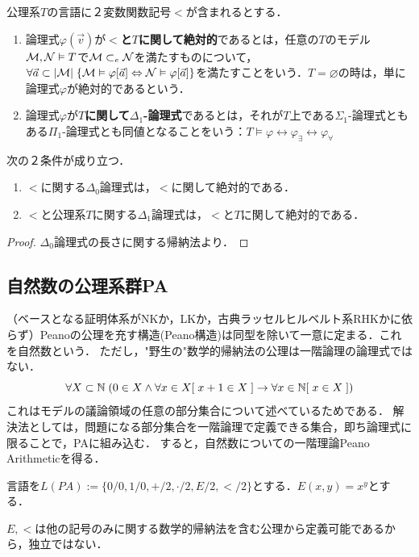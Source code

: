 \documentclass[uplatex, dvipdfmx]{jsreport}
\begin{document}
\begin{definition}
    公理系$T$の言語に２変数関数記号$<$が含まれるとする．
    \begin{enumerate}
        \item 論理式$\varphi(\vec{v})$が\textbf{$<$と$T$に関して絶対的}であるとは，任意の$T$のモデル$\mathcal{M},\mathcal{N}\vDash T$で$\mathcal{M}\subset_e\mathcal{N}$を満たすものについて，$\forall\vec{a}\subset|\mathcal{M}|\;\{\mathcal{M}\vDash\varphi[\vec{a}]\Leftrightarrow\mathcal{N}\vDash\varphi[\vec{a}]\}$を満たすことをいう．$T=\varnothing$の時は，単に論理式$\varphi$が絶対的であるという．
        \item 論理式$\varphi$が\textbf{$T$に関して$\Delta_1$-論理式}であるとは，それが$T$上である$\Sigma_1$-論理式ともある$\Pi_1$-論理式とも同値となることをいう：$T\vDash\varphi\leftrightarrow\varphi_\exists\leftrightarrow\varphi_\forall$
    \end{enumerate}
\end{definition}

\begin{lemma}
    次の２条件が成り立つ．
    \begin{enumerate}
        \item $<$に関する$\Delta_0$論理式は，$<$に関して絶対的である．
        \item $<$と公理系$T$に関する$\Delta_1$論理式は，$<$と$T$に関して絶対的である．
    \end{enumerate}
\end{lemma}
\begin{proof}
    $\Delta_0$論理式の長さに関する帰納法より．
\end{proof}

\subsection{自然数の公理系群PA}

（ベースとなる証明体系がNKか，LKか，古典ラッセルヒルベルト系RHKかに依らず）Peanoの公理を充す構造(Peano構造)は同型を除いて一意に定まる．これを自然数という．
ただし，"野生の"数学的帰納法の公理は一階論理の論理式ではない．
\[ \forall X\subset\mathbb{N}\;(0\in X\land\forall x\in X[\;x+1\in X\;]\to\forall x\in\mathbb{N}[\;x\in X\;]) \]
これはモデルの議論領域の任意の部分集合について述べているためである．
解決法としては，問題になる部分集合を一階論理で定義できる集合，即ち論理式に限ることで，PAに組み込む．
すると，自然数についての一階理論Peano Arithmeticを得る．

\begin{definition}[PAの言語]
    言語を$L(PA):=\{0/0,1/0,+/2,\cdot/2,E/2,</2\}$とする．$E(x,y)=x^y$とする．
\end{definition}
\begin{remark}
    $E,<$は他の記号のみに関する数学的帰納法を含む公理から定義可能であるから，独立ではない．
\end{remark}
\end{document}
